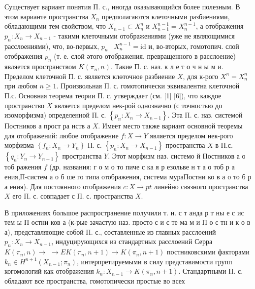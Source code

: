 \documentclass[10pt]{article}
\begin{document}
Существует вариант понятия П. с., иногда оказывающийся более полезным. В этом варианте пространства $X_{n}$ предполагаются клеточными разбиениями, обладающими тем свойством, что $X_{n-1} \subset X_{n}^{n}$ и $X_{n-1}^{n-1}=X_{n}^{n-1}$, а отображения $p_{n}: X_{n} \rightarrow X_{n-1}$ - такими клеточными отображениями (уже не являющимися расслоениями), что, во-первых, $p_{n} \mid X_{n}^{n-1}=\mathrm{id}$ и, во-вторых, гомотопич. слой отображения $p_{n}$ (т. е. слой әтого отображения, превращенного в расслоение) является пространством $K\left(\pi_{n}, n\right)$. Такие П. с. наз. к л е т о ч н ы м и. Пределом клеточной П. с. является клөточное разбиение $X$, для к-рого $X^{n}=X_{n}^{n}$ при любом $n \geqslant 1$. Произвольная П. с. гомотопически эквивалентна клеточной П.с. Основная теорема теории П. с. утверждает (см. [1] [6]), что каждое пространство $X$ является пределом нек-рой однозначно (с точностью до изоморфизма) определенной П. с. $\left\{p_{n}: X_{n} \rightarrow X_{n-1}\right\}$. Эта П. с. наз. системой Постников а прост ра нств а $X$. Имеет место также вариант основной теоремы для отображений: любое отображение $f: X \rightarrow Y$ является пределом нек-рого морфизма $\left\{f_{n}: X_{n} \rightarrow Y_{n}\right\}$ П. с. $\left\{p_{n}: X_{n} \rightarrow X_{n-1}\right\}$ пространства $X$ в П.с. $\left\{q_{n}: Y_{n} \rightarrow Y_{n-1}\right\}$ пространства $Y$. Этот морфизм наз. системо й Постников а о тоб ражения $f$ (др. названия: г о м о то пиче с ка я р езольве н т а о тоб р а ения,П-систем а о б ше го типа отображения, система мураПостни ко в а о то б р а ения). Для постоянного отображения $c: X \rightarrow p t$ линейно связного пространства $X$ его П. с. совпадает с П. с. пространства $X$.



В приложениях большое распространение получили т. н. с т анда р т ны е с ис тем ы П остни ков а (к-рые зачастую наз. просто с и с те ма м и П о с тн и к о в а), представляющие собой П. с., составленные из главных расслоений $p_{n}: X_{n} \rightarrow X_{n-1}$, индуцирующихся из стандартных расслоений Серра $K\left(\pi_{n}, n\right) \rightarrow$ $\rightarrow E K\left(\pi_{n}, n+1\right) \rightarrow K\left(\pi_{n}, n+1\right)$ постниковскими факторами $k_{n} \in H^{n+1}\left(X_{n-1} ; \pi_{n}\right)$, интерпретируемыми в силу представимости групп когомологий как отображения $k_{n}: X_{n-1} \rightarrow K\left(\pi_{n}, n+1\right)$. Стандартными П. с. обладают все пространства, гомотопически простые во всех
\end{document}
